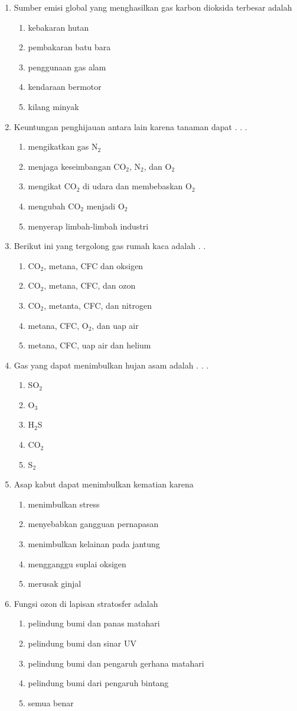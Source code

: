 \documentclass[10pt,a4paper]{extarticle}
\newcommand*\pilgan[1]{
\begin{enumerate}[label=\Alph*., itemsep=0pt,topsep=0pt,leftmargin=*,align=Center] #1 
\end{enumerate}}
\newcommand{\pilgani}[1]{                            \vspace{-0.3cm}\begin{multicols}{2}
 \begin{enumerate}[label=\Alph*., itemsep=0pt,topsep=0pt,leftmargin=*,align=Center]#1                     \end{enumerate}
 \phantom{ini cuma sapi, wedus, dan ayam}
 \end{multicols}}
\begin{document}
\begin{multicols}{3}
\begin{enumerate}
\item Sumber emisi global yang menghasilkan gas karbon dioksida terbesar adalah
\pilgan{
\item kebakaran hutan
\item pembakaran batu bara
\item penggunaan gas alam
\item kendaraan bermotor
\item kilang minyak}

\item Keuntungan penghijauan antara lain karena tanaman dapat . . .
\pilgan{
\item mengikatkan gas N$_2$
\item menjaga keseimbangan CO$_2$, N$_2$, dan O$_2$
\item mengikat CO$_2$ di udara dan membebaskan O$_2$
\item mengubah CO$_2$ menjadi O$_2$
\item menyerap limbah-limbah industri }


\item Berikut ini yang tergolong gas rumah kaca adalah . . 
\pilgan{
\item CO$_2$, metana, CFC dan oksigen
\item CO$_2$, metana, CFC, dan ozon
\item CO$_2$, metanta, CFC, dan nitrogen
\item metana, CFC, O$_2$, dan uap air
\item metana, CFC, uap air dan helium
}

\item Gas yang dapat menimbulkan hujan asam adalah . . .
\pilgani {
\item SO$_2$
\item O$_3$
\item H$_2$S
\item CO$_2$
\item S$_2$ }

\item Asap kabut dapat menimbulkan kematian karena
\pilgan{
   \item menimbulkan stress
   \item menyebabkan gangguan pernapasan
   \item menimbulkan kelainan pada jantung
   \item mengganggu suplai oksigen
   \item merusak ginjal}

\item Fungsi ozon di lapisan stratosfer adalah
\pilgan{
   \item pelindung bumi dan panas matahari
   \item pelindung bumi dan sinar UV
   \item pelindung bumi dan pengaruh gerhana matahari
   \item pelindung bumi dari pengaruh bintang
   \item semua benar }


\end{enumerate}
\end{multicols}
\end{document}
